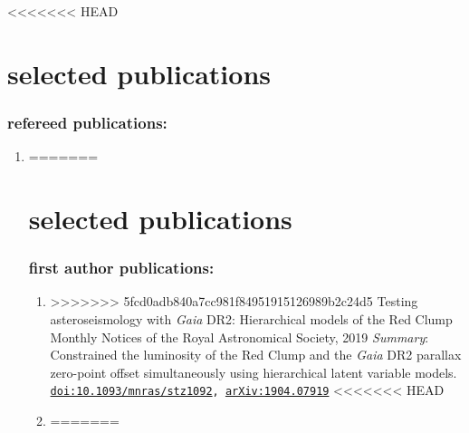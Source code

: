 \documentclass[letterpaper]{k-cv} %
\begin{document}
\clearpage
{}



<<<<<<< HEAD

\section{\color{c2}selected publications}
\vspace{-0.5cm}
\subsubsection*{\color{c2}refereed publications:}
\vspace{-0.2cm}
\begin{enumerate}
	\item {}
=======
\section{\color{c2}selected publications}
\vspace{-0.5cm}
\subsubsection*{\color{c2}first author publications:}
\vspace{-0.2cm}
\begin{enumerate}
	\item {}
>>>>>>> 5fcd0adb840a7cc981f84951915126989b2c24d5
	{Testing asteroseismology with \textit{Gaia} DR2: Hierarchical models of the Red Clump}
	{Monthly Notices of the Royal Astronomical Society, 2019}
	{\textit{Summary}: Constrained the luminosity of the Red Clump and the \textit{Gaia} DR2 parallax zero-point offset simultaneously using hierarchical latent variable models.}
	{\texttt{\href{https://academic.oup.com/mnras/article-abstract/486/3/3569/5475128}{doi:10.1093/mnras/stz1092}, \href{https://arxiv.org/abs/1904.07919}{arXiv:1904.07919}}}
<<<<<<< HEAD
	
	\item {}
=======
\end{enumerate}


\end{enumerate}
\end{document}
